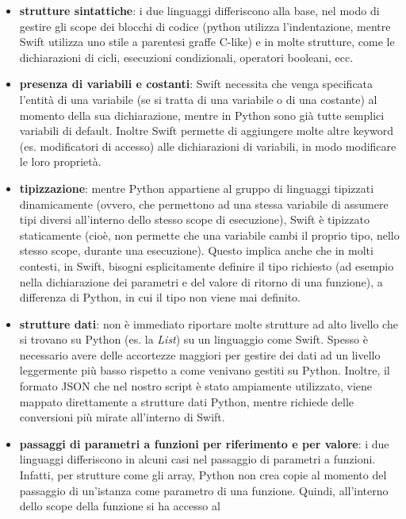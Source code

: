 \begin{itemize}
    \item \textbf{strutture sintattiche}: i due linguaggi differiscono alla base,
    nel modo di gestire gli scope dei blocchi di codice (python utilizza
    l'indentazione, mentre Swift utilizza uno stile a parentesi graffe
    C-like) e in molte strutture, come le dichiarazioni di cicli, 
    esecuzioni condizionali, operatori booleani, ecc.
    \item \textbf{presenza di variabili e costanti}: Swift necessita che venga 
    specificata l'entità di una variabile (se si tratta di una variabile
    o di una costante) al momento della sua dichiarazione, mentre in Python
    sono già tutte semplici variabili di default. Inoltre Swift permette
    di aggiungere molte altre keyword (es. modificatori di accesso) alle
    dichiarazioni di variabili, in modo modificare le loro proprietà.
    \item \textbf{tipizzazione}: mentre Python appartiene al gruppo di linguaggi
    tipizzati dinamicamente (ovvero, che permettono ad una stessa
    variabile di assumere tipi diversi all'interno dello stesso scope
    di esecuzione), Swift è tipizzato staticamente (cioè, non permette
    che una variabile cambi il proprio tipo, nello stesso scope, durante
    una esecuzione). Questo implica anche che in molti contesti, in Swift,
    bisogni esplicitamente definire il tipo richiesto (ad esempio nella
    dichiarazione dei parametri e del valore di ritorno di una funzione),
    a differenza di Python, in cui il tipo non viene mai definito. 
    \item \textbf{strutture dati}: non è immediato riportare molte strutture ad alto 
    livello che si trovano su Python (es. la \emph{List}) su un linguaggio
    come Swift. Spesso è necessario avere delle accortezze maggiori per 
    gestire dei dati ad un livello leggermente più basso rispetto a come 
    venivano gestiti su Python. Inoltre, il formato JSON che nel nostro 
    script è stato ampiamente utilizzato, viene mappato direttamente 
    a strutture dati Python, mentre richiede delle conversioni più
    mirate all'interno di Swift.
    \item \textbf{passaggi di parametri a funzioni per riferimento e per valore}:
    i due linguaggi differiscono in alcuni casi nel passaggio di parametri a 
    funzioni. Infatti, per strutture come gli array, Python non crea copie
    al momento del passaggio di un'istanza come parametro di una funzione.
    Quindi, all'interno dello scope della funzione si ha accesso al 

\end{itemize}
